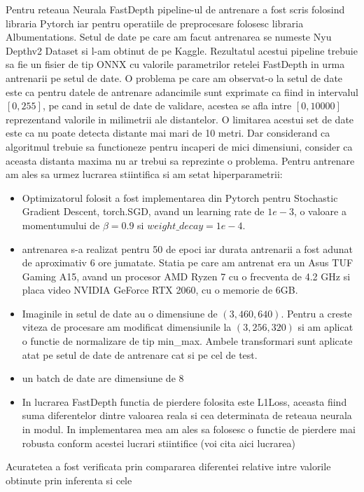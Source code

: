 \documentclass[12pt,a4paper]{report}
\begin{document}
Pentru reteaua Neurala FastDepth pipeline-ul de antrenare a fost scris folosind libraria Pytorch
iar pentru operatiile de preprocesare folosesc libraria Albumentations. Setul de date pe care 
am facut antrenarea se numeste Nyu Depthv2 Dataset si l-am obtinut de pe Kaggle. Rezultatul 
acestui pipeline trebuie sa fie un fisier de tip ONNX cu valorile parametrilor retelei FastDepth 
in urma antrenarii pe setul de date. O problema pe care am observat-o la setul de date este ca 
pentru datele de antrenare adancimile sunt exprimate ca fiind in intervalul $ [0, 255] $, pe cand in setul 
de date de validare, acestea se afla intre $ [0, 10000] $ reprezentand valorile in milimetrii ale
distantelor. O limitarea acestui set de date este ca nu poate detecta distante mai mari de 10 metri.
Dar considerand ca algoritmul trebuie sa functioneze pentru incaperi de mici dimensiuni, consider ca 
aceasta distanta maxima nu ar trebui sa reprezinte o problema. Pentru antrenare am ales sa urmez lucrarea
stiintifica si am setat hiperparametrii:
\begin{itemize}
    \item Optimizatorul folosit a fost implementarea din Pytorch pentru Stochastic Gradient Descent, 
torch.SGD, avand un learning rate de $ 1e-3 $, o valoare a momentumului de $ \beta=0.9 $ si
$ weight\_decay=1e-4 $.
    \item antrenarea s-a realizat pentru 50 de epoci iar durata antrenarii a fost adunat de aproximativ 
6 ore jumatate. Statia pe care am antrenat era un Asus TUF Gaming A15, avand un procesor AMD Ryzen 7 cu o frecventa 
de 4.2 GHz si placa video NVIDIA GeForce RTX 2060, cu o memorie de 6GB.\@
    \item Imaginile in setul de date au o dimensiune de $ (3, 460, 640) $. Pentru a creste viteza de procesare
am modificat dimensiunile la $ (3, 256, 320) $ si am aplicat o functie de normalizare de tip min\_max. Ambele 
transformari sunt aplicate atat pe setul de date de antrenare cat si pe cel de test.
    \item un batch de date are dimensiune de 8
    \item In lucrarea FastDepth functia de pierdere folosita este L1Loss, aceasta fiind suma diferentelor dintre valoarea 
reala si cea determinata de reteaua neurala in modul. In implementarea mea am ales sa folosesc o functie de pierdere 
mai robusta conform acestei lucrari stiintifice (voi cita aici lucrarea) 
\end{itemize}
Acuratetea a fost verificata  prin compararea diferentei relative intre valorile obtinute prin inferenta si cele 
\end{document}
